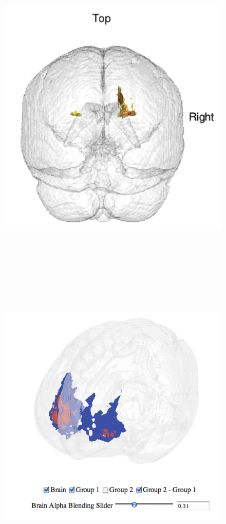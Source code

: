 \documentclass[final]{beamer}\usepackage{graphicx, color}
\begin{document}
\begin{frame}[fragile]
\begin{multicols}{2}
\begin{figure}
  \begin{minipage}[t]{3.5in}
    \includegraphics[width=6in, height=6in]{snapshot_crop.png}
  \end{minipage}\hfill
  \begin{minipage}[t]{3.5in}
    \includegraphics[width=6in, height=6in]{./figure/4D_snapshot2.png}

\end{minipage}
\end{figure}
\end{multicols}
\end{frame}
\end{document}
